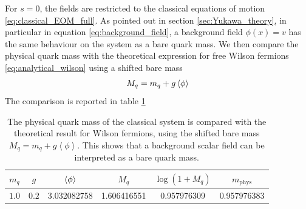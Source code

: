 For $s=0$, the fields are restricted to the classical equations of motion \eqref{eq:classical_EOM_full}. As pointed out in section \ref{sec:Yukawa_theory}, in particular in equation \eqref{eq:background_field}, a background field $\phi(x) = v$ has the same behaviour on the system as a bare quark mass. We then compare the physical quark mass with the theoretical expression for free Wilson fermions \eqref{eq:analytical_wilson} using a shifted bare mass 
\begin{equation*}
	M_q = m_q + g \left\langle \phi \right\rangle
\end{equation*}
The comparison is reported in table \ref{tab:background_field}
\begin{table}[htp]
    \centering
    \begin{tabular}{cccccc}
        \toprule
        $m_q$ & $g$ & $\left\langle \phi \right\rangle$ & $M_q$ & $\log(1+M_q)$ & $m_\text{phys}$ \\
        \midrule
	$1.0$ & $0.2$ & 3.032082758 & 1.606416551
    & 0.957976309
    & 0.957976383 \\
        \bottomrule
    \end{tabular}
    \caption[Background field and quark mass]{The physical quark mass of the classical system is compared with the theoretical result for Wilson fermions, using the shifted bare mass $M_q = m_q + g \left\langle\phi\right\rangle$. This shows that a background scalar field can be interpreted as a bare quark mass.}
    \label{tab:background_field}
\end{table}

\newpage


